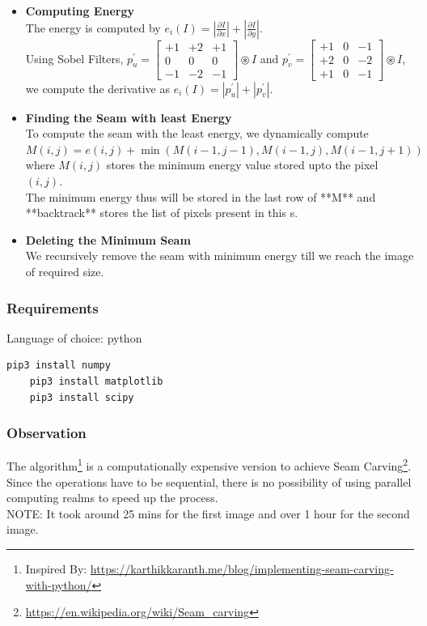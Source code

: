 \begin{itemize}

	\item \textbf{Computing Energy} \\
The energy is computed by $e_i(I)=\left|\frac{\partial I}{\partial x}\right| + \left|\frac{\partial I}{\partial y}\right|$. \\
Using Sobel Filters, 
$p^{\prime}_u = \begin{bmatrix} +1 & +2 & +1\\ 0 & 0 & 0 \\ -1 & -2 & -1 \end{bmatrix} \circledast I$ and 
$p^{\prime}_v = \begin{bmatrix} +1 & 0 & -1\\ +2 & 0 & -2 \\ +1 & 0 & -1 \end{bmatrix} \circledast I$, we compute the derivative as $e_i(I)=\left|p^{\prime}_u\right| + \left|p^{\prime}_v\right|$.

	\item \textbf{Finding the Seam with least Energy} \\
To compute the seam with the least energy, we dynamically compute $M\left(i,j\right)=e\left(i,j\right)+\min\left( M\left(i-1,j-1\right), M\left(i-1,j\right), M\left(i-1,j+1\right)\right)$ where $M\left(i,j\right)$ stores the minimum energy value stored upto the pixel $\left(i,j\right)$.\\
The minimum energy thus will be stored in the last row of **M** and **backtrack** stores the list of pixels present in this s.

	\item \textbf{Deleting the Minimum Seam} \\
We recursively remove the seam with minimum energy till we reach the image of required size.
\end{itemize}

\subsubsection{Requirements}
Language of choice: python
\begin{lstlisting}[language=bash]
	pip3 install numpy
	pip3 install matplotlib
	pip3 install scipy
\end{lstlisting}

\subsubsection{Observation}
The algorithm\footnote{Inspired By: \url{https://karthikkaranth.me/blog/implementing-seam-carving-with-python/}} is a computationally expensive version to achieve Seam Carving\footnote{\url{https://en.wikipedia.org/wiki/Seam_carving}}. Since the operations have to be sequential, there is no possibility of using parallel computing realms to speed up the process.\\
NOTE: It took around 25 mins for the first image and over 1 hour for the second image.

